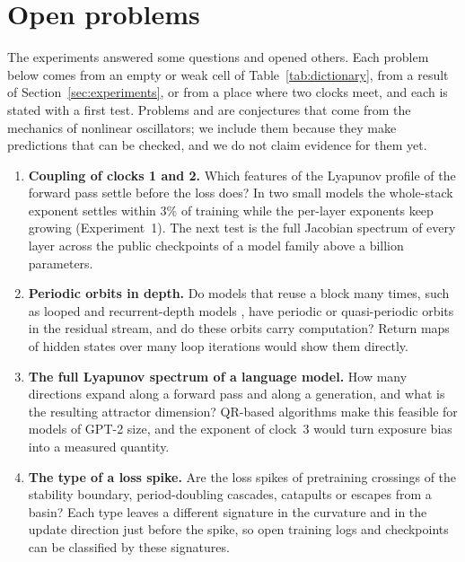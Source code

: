 \FloatBarrier
\section{Open problems}
\label{sec:open}

The experiments answered some questions and opened others. Each problem below comes from an empty or weak cell of Table~\ref{tab:dictionary}, from a result of Section~\ref{sec:experiments}, or from a place where two clocks meet, and each is stated with a first test. Problems  and  are conjectures that come from the mechanics of nonlinear oscillators; we include them because they make predictions that can be checked, and we do not claim evidence for them yet.

\begin{enumerate}[label=\textbf{OP\,\arabic*.}, leftmargin=*, itemsep=3pt]
\item \textbf{Coupling of clocks 1 and 2.} Which features of the Lyapunov profile of the forward pass settle before the loss does? In two small models the whole-stack exponent settles within 3\% of training while the per-layer exponents keep growing (Experiment~1). The next test is the full Jacobian spectrum of every layer across the public checkpoints of a model family above a billion parameters.

\item \textbf{Periodic orbits in depth.} Do models that reuse a block many times, such as looped and recurrent-depth models \citep{prairie2026parcae}, have periodic or quasi-periodic orbits in the residual stream, and do these orbits carry computation? Return maps of hidden states over many loop iterations would show them directly.

\item \textbf{The full Lyapunov spectrum of a language model.} How many directions expand along a forward pass and along a generation, and what is the resulting attractor dimension? QR-based algorithms \citep{engelken2020lyapunov,vogt2020lyapunov} make this feasible for models of GPT-2 size, and the exponent of clock~3 would turn exposure bias into a measured quantity.

\item \textbf{The type of a loss spike.} Are the loss spikes of pretraining crossings of the stability boundary, period-doubling cascades, catapults \citep{lewkowycz2020large} or escapes from a basin? Each type leaves a different signature in the curvature and in the update direction just before the spike, so open training logs and checkpoints can be classified by these signatures.


\end{enumerate}
